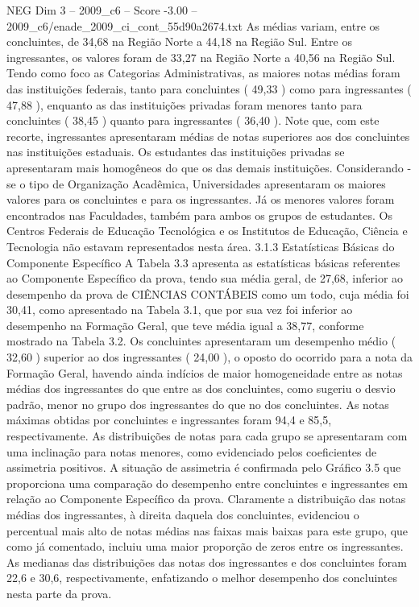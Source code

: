 \begin{textsample}{NEG Dim 3 – 2009\_c6 – Score -3.00 – 2009\_c6/enade\_2009\_ci\_cont\_55d90a2674.txt}
As médias variam, entre os concluintes, de 34,68 na Região Norte a 44,18 na Região Sul.
Entre os ingressantes, os valores foram de 33,27 na Região Norte a 40,56 na Região Sul.
Tendo como foco as Categorias Administrativas, as maiores notas médias foram das instituições federais, tanto para concluintes ( 49,33 ) como para ingressantes ( 47,88 ), enquanto as das instituições privadas foram menores tanto para concluintes ( 38,45 ) quanto para ingressantes ( 36,40 ).
Note que, com este recorte, ingressantes apresentaram médias de notas superiores aos dos concluintes nas instituições estaduais.
Os estudantes das instituições privadas se apresentaram mais homogêneos do que os das demais instituições.
Considerando -se o tipo de Organização Acadêmica, Universidades apresentaram os maiores valores para os concluintes e para os ingressantes.
Já os menores valores foram encontrados nas Faculdades, também para ambos os grupos de estudantes.
Os Centros Federais de Educação Tecnológica e os Institutos de Educação, Ciência e Tecnologia não estavam representados nesta área. 3.1.3 Estatísticas Básicas do Componente Específico A Tabela 3.3 apresenta as estatísticas básicas referentes ao Componente Específico da prova, tendo sua média geral, de 27,68, inferior ao desempenho da prova de CIÊNCIAS CONTÁBEIS como um todo, cuja média foi 30,41, como apresentado na Tabela 3.1, que por sua vez foi inferior ao desempenho na Formação Geral, que teve média igual a 38,77, conforme mostrado na Tabela 3.2.
Os concluintes apresentaram um desempenho médio ( 32,60 ) superior ao dos ingressantes ( 24,00 ), o oposto do ocorrido para a nota da Formação Geral, havendo ainda indícios de maior homogeneidade entre as notas médias dos ingressantes do que entre as dos concluintes, como sugeriu o desvio padrão, menor no grupo dos ingressantes do que no dos concluintes.
As notas máximas obtidas por concluintes e ingressantes foram 94,4 e 85,5, respectivamente.
As distribuições de notas para cada grupo se apresentaram com uma inclinação para notas menores, como evidenciado pelos coeficientes de assimetria positivos.
A situação de assimetria é confirmada pelo Gráfico 3.5 que proporciona uma comparação do desempenho entre concluintes e ingressantes em relação ao Componente Específico da prova.
Claramente a distribuição das notas médias dos ingressantes, à direita daquela dos concluintes, evidenciou o percentual mais alto de notas médias nas faixas mais baixas para este grupo, que como já comentado, incluiu uma maior proporção de zeros entre os ingressantes.
As medianas das distribuições das notas dos ingressantes e dos concluintes foram 22,6 e 30,6, respectivamente, enfatizando o melhor desempenho dos concluintes nesta parte da prova.

\end{textsample}
